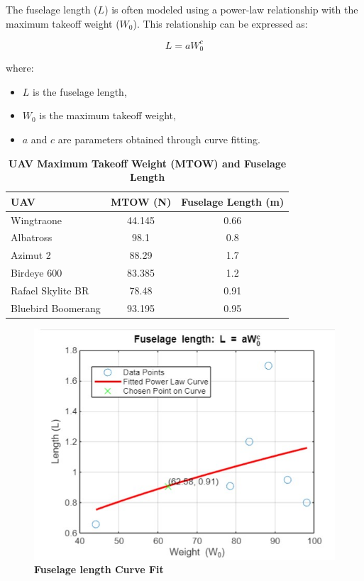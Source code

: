 \documentclass[12 pt]{article}
\begin{document}
{{The fuselage length (\(L\)) is often modeled using a power-law relationship with the maximum takeoff weight (\(W_0\)). This relationship can be expressed as:}

\textbf{\[ L = a W_0^c \]}

where:
\begin{itemize}
    \item \(L\) is the fuselage length,
    \item \(W_0\) is the maximum takeoff weight,
    \item \(a\) and \(c\) are parameters obtained through curve fitting.
\end{itemize}
\begin{table}[htbp]
  \centering
  \caption{\textbf{UAV Maximum Takeoff Weight (MTOW) and Fuselage Length}}
  \begin{tabular}{|l|c|c|}
    \hline
    \textbf{UAV} & \textbf{MTOW (N)} & \textbf{Fuselage Length (m)} \\
    \hline
    Wingtraone & 44.145 & 0.66 \\
    Albatross & 98.1 & 0.8 \\
    Azimut 2 & 88.29 & 1.7 \\
    Birdeye 600 & 83.385 & 1.2 \\
    Rafael Skylite BR & 78.48 & 0.91 \\
    Bluebird Boomerang & 93.195 & 0.95 \\
    \hline
  \end{tabular}
\end{table}
\begin{figure}[H]
    \centering
    \includegraphics[width=\linewidth]{Codes/Week 6/Fuselage length curve fit.jpg}
    \caption{\textbf{Fuselage length Curve Fit}}
    \label{Fuselage length curve fit}
\end{figure}

}
\end{document}
